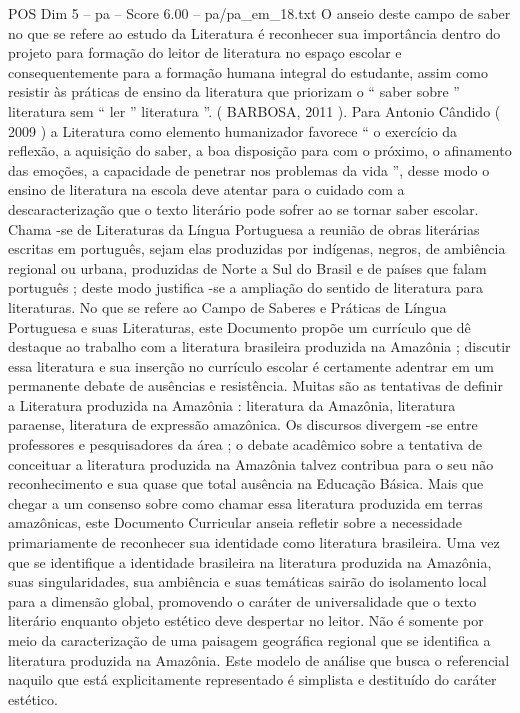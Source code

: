 \begin{textsample}{POS Dim 5 – pa – Score 6.00 – pa/pa\_em\_18.txt}
O anseio deste campo de saber no que se refere ao estudo da Literatura é reconhecer sua importância dentro do projeto para formação do leitor de literatura no espaço escolar e consequentemente para a formação humana integral do estudante, assim como resistir às práticas de ensino da literatura que priorizam o “ saber sobre ” literatura sem “ ler ” literatura ”. ( BARBOSA, 2011 ).
Para Antonio Cândido ( 2009 ) a Literatura como elemento humanizador favorece “ o exercício da reflexão, a aquisição do saber, a boa disposição para com o próximo, o afinamento das emoções, a capacidade de penetrar nos problemas da vida ”, desse modo o ensino de literatura na escola deve atentar para o cuidado com a descaracterização que o texto literário pode sofrer ao se tornar saber escolar.
Chama -se de Literaturas da Língua Portuguesa a reunião de obras literárias escritas em português, sejam elas produzidas por indígenas, negros, de ambiência regional ou urbana, produzidas de Norte a Sul do Brasil e de países que falam português ; deste modo justifica -se a ampliação do sentido de literatura para literaturas.
No que se refere ao Campo de Saberes e Práticas de Língua Portuguesa e suas Literaturas, este Documento propõe um currículo que dê destaque ao trabalho com a literatura brasileira produzida na Amazônia ; discutir essa literatura e sua inserção no currículo escolar é certamente adentrar em um permanente debate de ausências e resistência.
Muitas são as tentativas de definir a Literatura produzida na Amazônia : literatura da Amazônia, literatura paraense, literatura de expressão amazônica.
Os discursos divergem -se entre professores e pesquisadores da área ; o debate acadêmico sobre a tentativa de conceituar a literatura produzida na Amazônia talvez contribua para o seu não reconhecimento e sua quase que total ausência na Educação Básica.
Mais que chegar a um consenso sobre como chamar essa literatura produzida em terras amazônicas, este Documento Curricular anseia refletir sobre a necessidade primariamente de reconhecer sua identidade como literatura brasileira.
Uma vez que se identifique a identidade brasileira na literatura produzida na Amazônia, suas singularidades, sua ambiência e suas temáticas sairão do isolamento local para a dimensão global, promovendo o caráter de universalidade que o texto literário enquanto objeto estético deve despertar no leitor.
Não é somente por meio da caracterização de uma paisagem geográfica regional que se identifica a literatura produzida na Amazônia.
Este modelo de análise que busca o referencial naquilo que está explicitamente representado é simplista e destituído do caráter estético.

\end{textsample}

